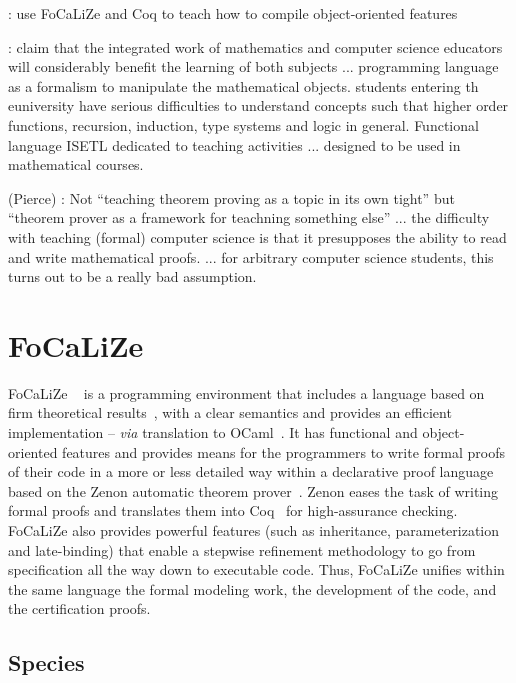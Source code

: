 \documentclass[submission,copyright,creativecommons]{eptcs}
\def\focalize{FoCaLiZe \mbox{}}
\begin{document}
\cite{Coq-Ens} : use \focalize and Coq to teach how to compile
 object-oriented features


\cite{darosa02}: claim that the integrated work of mathematics and
computer science educators will considerably benefit the learning of
both subjects ... programming language as a formalism to manipulate
the mathematical objects. students entering th euniversity have
serious difficulties to understand concepts such that higher order
functions, recursion, induction, type systems and logic in general.
Functional language  ISETL dedicated to teaching activities
... designed to be used in mathematical courses.

\cite{DBLP:conf/icfp/Pierce09} (Pierce) :
Not ``teaching theorem proving as a topic in its own tight'' but
``theorem prover as a framework for teachning something else''
... the difficulty with teaching (formal) computer science is that it
presupposes the ability to read and write mathematical proofs. ... for
arbitrary computer science students, this turns out to be a really bad assumption.


\section{\focalize}




\focalize~\cite{foc03} is a
programming environment that includes
a language based on firm theoretical
results~\cite{PrevostoJAR02}, with a clear semantics and provides an efficient
implementation -- {\it via} translation to OCaml~\cite{ocamldocu}.  It has
functional and object-oriented features and
provides means for the programmers to write formal proofs
of their
code
in a more or less detailed way
within a declarative proof language based on the Zenon automatic
theorem prover~\cite{conf/lpar/BonichonDD07}.
Zenon eases the task of writing formal proofs and
translates them into Coq~\cite{coq84} for high-assurance checking.
\focalize also provides powerful features (such as
inheritance, parameterization and late-binding) that enable
a stepwise refinement methodology to go from specification all the way
down to executable code.
Thus, \focalize unifies within the same language the formal modeling
work, the development of the code, and the certification proofs.

\subsection{Species}
\end{document}
